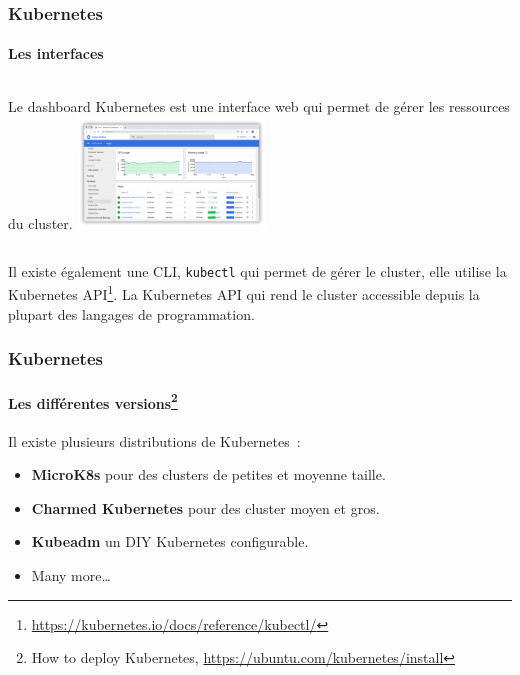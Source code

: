 \documentclass{beamer}
\begin{document}
    \begin{frame}
        \transdissolve
        \frametitle{Kubernetes}
        \framesubtitle{Les interfaces}
        \begin{columns}
            Le dashboard Kubernetes est une interface web qui permet de gérer les ressources du cluster\footnotemark.
            \centering
            \includegraphics[width=5cm]{image/kubernetes-dashboard}
        \end{columns}
        \flushleft
        \bigbreak
        Il existe également une CLI, \lstinline{kubectl} qui permet de gérer le cluster, elle utilise la Kubernetes API\footnote{\url{https://kubernetes.io/docs/reference/kubectl/}}.
        \bigbreak
        La Kubernetes API qui rend le cluster accessible depuis la plupart des langages de programmation.
    \end{frame}

    \begin{frame}
        \transdissolve
        \frametitle{Kubernetes}
        \framesubtitle{Les différentes versions\footnote{How to deploy Kubernetes, \url{https://ubuntu.com/kubernetes/install}}}
        Il existe plusieurs distributions de Kubernetes~:
        \begin{itemize}
            \item \textbf{MicroK8s} pour des clusters de petites et moyenne taille.
            \item \textbf{Charmed Kubernetes} pour des cluster moyen et gros.
            \item \textbf{Kubeadm} un DIY Kubernetes configurable.
            \item Many more\ldots
        \end{itemize}
    \end{frame}
\end{document}
